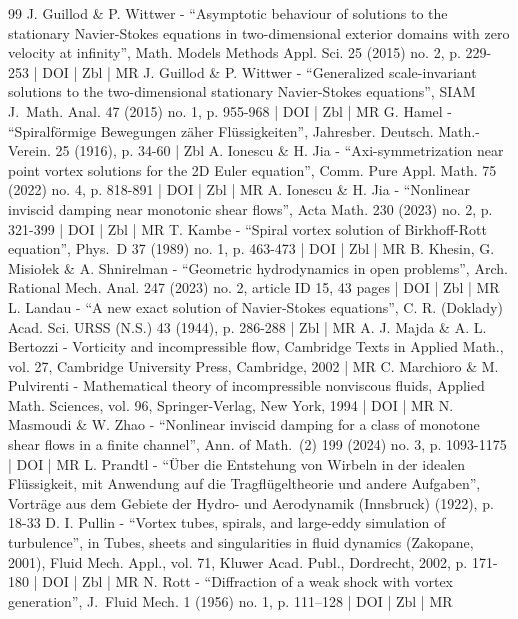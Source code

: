 \documentclass[10pt]{amsart}
\theoremstyle{plain}
\theoremstyle{definition}
\begin{document}
\begin{thebibliography}{99}
J. Guillod \& P. Wittwer - “Asymptotic behaviour of solutions to the stationary Navier-Stokes equations in two-dimensional exterior domains with zero velocity at infinity”, Math. Models Methods Appl. Sci. 25 (2015) no. 2, p. 229-253 | DOI | Zbl | MR
J. Guillod \& P. Wittwer - “Generalized scale-invariant solutions to the two-dimensional stationary Navier-Stokes equations”, SIAM J. Math. Anal. 47 (2015) no. 1, p. 955-968 | DOI | Zbl | MR
G. Hamel - “Spiralförmige Bewegungen zäher Flüssigkeiten”, Jahresber. Deutsch. Math.-Verein. 25 (1916), p. 34-60 | Zbl
A. Ionescu \& H. Jia - “Axi-symmetrization near point vortex solutions for the 2D Euler equation”, Comm. Pure Appl. Math. 75 (2022) no. 4, p. 818-891 | DOI | Zbl | MR
A. Ionescu \& H. Jia - “Nonlinear inviscid damping near monotonic shear flows”, Acta Math. 230 (2023) no. 2, p. 321-399 | DOI | Zbl | MR
T. Kambe - “Spiral vortex solution of Birkhoff-Rott equation”, Phys. D 37 (1989) no. 1, p. 463-473 | DOI | Zbl | MR
B. Khesin, G. Misiołek \& A. Shnirelman - “Geometric hydrodynamics in open problems”, Arch. Rational Mech. Anal. 247 (2023) no. 2, article ID 15, 43 pages | DOI | Zbl | MR
L. Landau - “A new exact solution of Navier-Stokes equations”, C. R. (Doklady) Acad. Sci. URSS (N.S.) 43 (1944), p. 286-288 | Zbl | MR
A. J. Majda \& A. L. Bertozzi - Vorticity and incompressible flow, Cambridge Texts in Applied Math., vol. 27, Cambridge University Press, Cambridge, 2002 | MR
C. Marchioro \& M. Pulvirenti - Mathematical theory of incompressible nonviscous fluids, Applied Math. Sciences, vol. 96, Springer-Verlag, New York, 1994 | DOI | MR
N. Masmoudi \& W. Zhao - “Nonlinear inviscid damping for a class of monotone shear flows in a finite channel”, Ann. of Math. (2) 199 (2024) no. 3, p. 1093-1175 | DOI | MR
L. Prandtl - “Über die Entstehung von Wirbeln in der idealen Flüssigkeit, mit Anwendung auf die Tragflügeltheorie und andere Aufgaben”, Vorträge aus dem Gebiete der Hydro- und Aerodynamik (Innsbruck) (1922), p. 18-33
D. I. Pullin - “Vortex tubes, spirals, and large-eddy simulation of turbulence”, in Tubes, sheets and singularities in fluid dynamics (Zakopane, 2001), Fluid Mech. Appl., vol. 71, Kluwer Acad. Publ., Dordrecht, 2002, p. 171-180 | DOI | Zbl | MR
N. Rott - “Diffraction of a weak shock with vortex generation”, J. Fluid Mech. 1 (1956) no. 1, p. 111–128 | DOI | Zbl | MR

\end{thebibliography}
\end{document}
